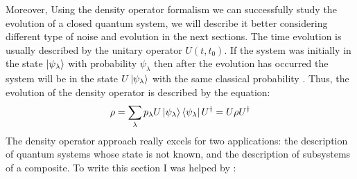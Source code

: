 Moreover, Using the density operator formalism we can successfully study the evolution of a closed quantum system, we will describe it better considering different type of noise and evolution in the next sections. The time evolution is usually described by the unitary operator $U(t,t_0)$. If the system was initially in the state $\ket{\psi_{\lambda}}$ with probability $\psi_{\lambda}$ then after the evolution has occurred the system will be in the state $U\ket{\psi_{\lambda}}$ with the same classical probability . Thus, the evolution of the density operator is described by the equation: 
\begin{equation}
    \rho = \sum_{\lambda} p_{\lambda} U\ket{\psi_{\lambda}}\bra{\psi_{\lambda}}U^{\dagger} = U\rho U^{\dagger}
\end{equation}
The density operator approach really excels for two applications: the description of quantum systems whose state is not known, and the description of subsystems of a composite. To write this section I was helped by : \cite{Dalfovo}\cite{Chuang}\cite{Hauke}\cite{Qiskit}

